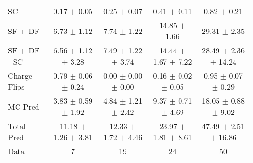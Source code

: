 \begin{tabular}{l|cccc}
                                 SC &  0.17 $\pm$  0.05 &  0.25 $\pm$  0.07 &  0.41 $\pm$  0.11 &  0.82 $\pm$  0.21 \\
                            SF + DF &  6.73 $\pm$  1.12 &  7.74 $\pm$  1.22 & 14.85 $\pm$  1.66 & 29.31 $\pm$  2.35 \\
\hline
                       SF + DF - SC &  6.56 $\pm$  1.12 $\pm$  3.28 &  7.49 $\pm$  1.22 $\pm$  3.74 & 14.44 $\pm$  1.67 $\pm$  7.22 & 28.49 $\pm$  2.36 $\pm$ 14.24 \\
\hline\hline
                       Charge Flips &  0.79 $\pm$  0.06 $\pm$  0.24 &  0.00 $\pm$  0.00 $\pm$  0.00 &  0.16 $\pm$  0.02 $\pm$  0.05 &  0.95 $\pm$  0.07 $\pm$  0.29 \\
\hline
                            MC Pred &  3.83 $\pm$  0.59 $\pm$  1.92 &  4.84 $\pm$  1.21 $\pm$  2.42 &  9.37 $\pm$  0.71 $\pm$  4.69 & 18.05 $\pm$  0.88 $\pm$  9.02 \\
\hline
                         Total Pred & 11.18 $\pm$  1.26 $\pm$  3.81 & 12.33 $\pm$  1.72 $\pm$  4.46 & 23.97 $\pm$  1.81 $\pm$  8.61 & 47.49 $\pm$  2.51 $\pm$ 16.86 \\
\hline\hline
                               Data &     7 &    19 &    24 &    50 \\
\hline\hline
\end{tabular}


